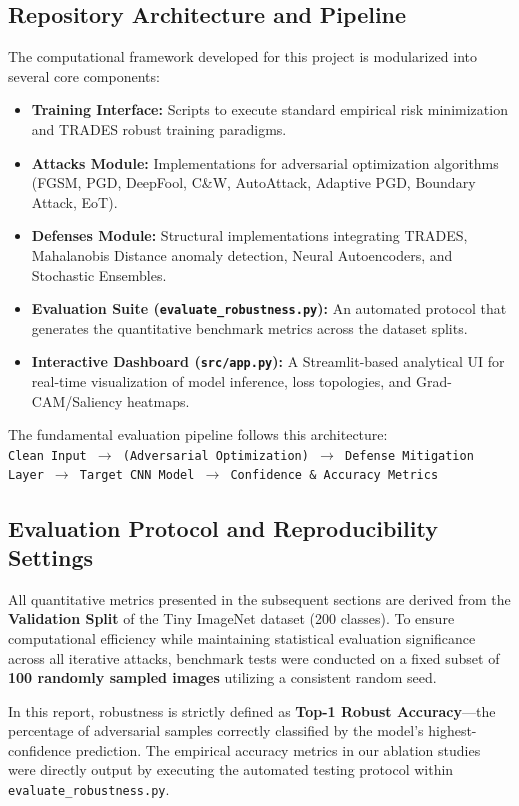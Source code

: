\documentclass[12pt, a4paper]{article}
\begin{document}
\subsection{Repository Architecture and Pipeline}
The computational framework developed for this project is modularized into several core components:
\begin{itemize}
    \item \textbf{Training Interface:} Scripts to execute standard empirical risk minimization and TRADES robust training paradigms.
    \item \textbf{Attacks Module:} Implementations for adversarial optimization algorithms (FGSM, PGD, DeepFool, C\&W, AutoAttack, Adaptive PGD, Boundary Attack, EoT).
    \item \textbf{Defenses Module:} Structural implementations integrating TRADES, Mahalanobis Distance anomaly detection, Neural Autoencoders, and Stochastic Ensembles.
    \item \textbf{Evaluation Suite (\texttt{evaluate\_robustness.py}):} An automated protocol that generates the quantitative benchmark metrics across the dataset splits.
    \item \textbf{Interactive Dashboard (\texttt{src/app.py}):} A Streamlit-based analytical UI for real-time visualization of model inference, loss topologies, and Grad-CAM/Saliency heatmaps.
\end{itemize}

The fundamental evaluation pipeline follows this architecture: \\
\texttt{Clean Input $\rightarrow$ (Adversarial Optimization) $\rightarrow$ Defense Mitigation Layer $\rightarrow$ Target CNN Model $\rightarrow$ Confidence \& Accuracy Metrics}

\subsection{Evaluation Protocol and Reproducibility Settings}
All quantitative metrics presented in the subsequent sections are derived from the \textbf{Validation Split} of the Tiny ImageNet dataset (200 classes). To ensure computational efficiency while maintaining statistical evaluation significance across all iterative attacks, benchmark tests were conducted on a fixed subset of \textbf{100 randomly sampled images} utilizing a consistent random seed. 

In this report, robustness is strictly defined as \textbf{Top-1 Robust Accuracy}—the percentage of adversarial samples correctly classified by the model's highest-confidence prediction. The empirical accuracy metrics in our ablation studies were directly output by executing the automated testing protocol within \texttt{evaluate\_robustness.py}.
\end{document}
